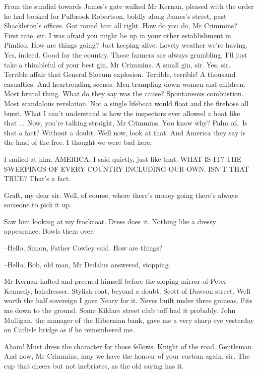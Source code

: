 From the sundial towards James's gate
walked Mr Kernan,
pleased with the order he had booked for Pulbrook Robertson,
boldly along James's street,
past Shackleton's offices.
Got round him all right.
How do you do, Mr Crimmins?
First rate, sir.
I was afraid you might be up in your other establishment in Pimlico.
How are things going?
Just keeping alive.
Lovely weather we're having.
Yes, indeed.
Good for the country.
Those farmers are always grumbling.
I'll just take a thimbleful of your best gin, Mr Crimmins.
A small gin, sir.
Yes, sir.
Terrible affair that
General Slocum explosion.
Terrible, terrible!
A thousand casualties.
And heartrending scenes.
Men trampling down women and children.
Most brutal thing.
What do they say was the cause?
Spontaneous combustion.
Most scandalous revelation.
Not a single lifeboat would float and the firehose all burst.
What I can't understand
is how the inspectors ever allowed a boat like that ...
Now, you're talking straight, Mr Crimmins.
You know why?
Palm oil.
Is that a fact?
Without a doubt.
Well now, look at that.
And America they say is the land of the free.
I thought we were bad here.

I smiled at him. AMERICA, I said quietly, just like that. WHAT IS IT? THE
SWEEPINGS OF EVERY COUNTRY INCLUDING OUR OWN. ISN'T THAT TRUE? That's a
fact.

Graft, my dear sir. Well, of course, where there's money going there's
always someone to pick it up.

Saw him looking at my frockcoat. Dress does it. Nothing like a dressy
appearance. Bowls them over.

--Hello, Simon, Father Cowley said.
How are things?

--Hello, Bob, old man, Mr Dedalus answered, stopping.

Mr Kernan halted and preened himself before the sloping mirror of Peter
Kennedy, hairdresser. Stylish coat, beyond a doubt. Scott of Dawson
street. Well worth the half sovereign I gave Neary for it. Never built
under three guineas. Fits me down to the ground. Some Kildare street club
toff had it probably. John Mulligan, the manager of the Hibernian bank,
gave me a very sharp eye yesterday on Carlisle bridge as if he remembered
me.

Aham!
Must dress the character for those fellows.
Knight of the road.
Gentleman.
And now, Mr Crimmins, may we have the honour of your custom again, sir.
The cup that cheers but not inebriates,
as the old saying has it.

